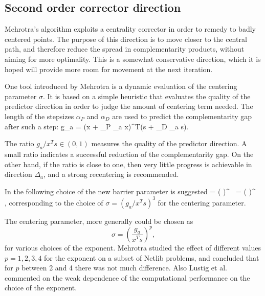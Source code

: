 
%
%
\subsection{Second order corrector direction}

Mehrotra's algorithm exploits a centrality corrector in order to 
remedy to badly centered points. The purpose of this direction is 
to move closer to the central path, and therefore reduce the spread 
in complementarity products, without aiming for more optimality. 
This is a somewhat conservative direction, which it is hoped will 
provide more room for movement at the next iteration.

One tool introduced by Mehrotra \cite{Mehrotra92} is a dynamic evaluation 
of the centering parameter $\sigma$. It is based on a simple  
heuristic that evaluates the quality of the predictor direction
in order to judge the amount of centering term needed.
%
The length of the stepsizes $\alpha_P$ and $\alpha_D$ are used to 
predict the complementarity gap after such a step:
\be \label{eq:PredictedGap}
  g_a = (x + \alpha_P \Delta_a x)^T(s + \alpha_D \Delta_a s).
\ee

The ratio $g_a / x^{T}s \in (0,1)$ measures the quality of the 
predictor direction.
A small ratio indicates a successful reduction of the complementarity 
gap. On the other hand, if the ratio is close to one, then very little 
progress is achievable in direction $\Delta_a$, and a strong recentering 
is recommended.

In \cite{Mehrotra92} the following choice of the new barrier parameter 
is suggested
%
\be \label{eq:Mu}
  \mu = \left(  \right)^{} \, 
           = \left(  \right)^{} \, ,
\ee
%
corresponding to the choice of $\sigma = (g_a / x^Ts)^3$ 
for the centering parameter. 

The centering parameter, more generally could be chosen as
\[
  \sigma = \left( \frac{g_a}{x^Ts} \right)^p\!\!,
\]
for various choices of the exponent. Mehrotra \cite{Mehrotra92}
studied the effect of different values $p=1,2,3,4$ for the exponent
on a subset of Netlib problems, and concluded that for $p$ between
2 and 4 there was not much difference.
Also Lustig et al. \cite{LustigMarstenShanno} commented on the
weak dependence of the computational performance on the choice 
of the exponent.

